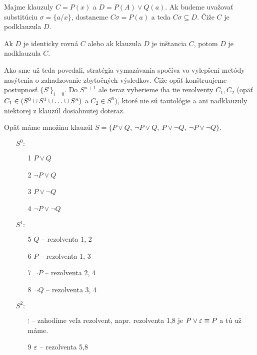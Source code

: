 \begin{priklad}
    Majme klauzuly $C = P(x)$ a $D = P(A) \lor Q(a)$.
    Ak budeme uvažovať substitúciu $\sigma = \{a/x\}$, dostaneme
    $C\sigma = P(a)$ a teda $C\sigma \subseteq D$.
    Čiže $C$ je podklauzula $D$.
\end{priklad}

\begin{poznamka}
    Ak $D$ je identicky rovná $C$ alebo ak klauzula $D$ je inštancia $C$, 
    potom $D$ je nadklauzula $C$.
\end{poznamka}


Ako sme už teda povedali, stratégia vymazávania spočíva vo vylepšení metódy
nasýtenia o zahadzovanie zbytočných výsledkov.
Čiže opäť konštruujeme postupnosť $\{S^i\}_{i=0}$.
Do $S^{n+1}$ ale teraz vyberieme iba tie rezolventy $C_1, C_2$ 
(opäť $C_1 \in (S^0 \union S^1 \union \dots \union S^n)$ a $C_2 \in S^n$),
ktoré nie sú tautológie a ani nadklauzuly niektorej z klauzúl dosiahnutej
doteraz.

\begin{priklad}
    Opäť máme množinu klauzúl $S=\{P\lor Q,\ \neg P\lor Q,\ 
        P \lor \neg Q,\ \neg P \lor \neg Q\}$.

    \begin{itemize}
    \item[$S^0:$]
        \begin{itemize}
            \item[1] $P\lor Q$
            \item[2] $\neg P \lor Q$
            \item[3] $P\lor \neg Q$
            \item[4] $\neg P \lor \neg Q$
        \end{itemize}

    \item[$S^1:$]
        \begin{itemize}
        \item[5] $Q$ -- rezolventa 1, 2
        \item[6] $P$ -- rezolventa 1, 3
        \item[7] $\neg P$ -- rezolventa 2, 4
        \item[8] $\neg Q$ -- rezolventa 3, 4
        \end{itemize}

    \item[$S^2:$]
        \begin{itemize}
            \item[$\vdots$] -- zahodíme veľa rezolvent, napr. rezolventa
                1,8 je $P \lor \varepsilon \equiv P$ a tú už máme.
            \item[9] $\varepsilon$ -- rezolventa 5,8
        \end{itemize}
    \end{itemize}
\end{priklad}

